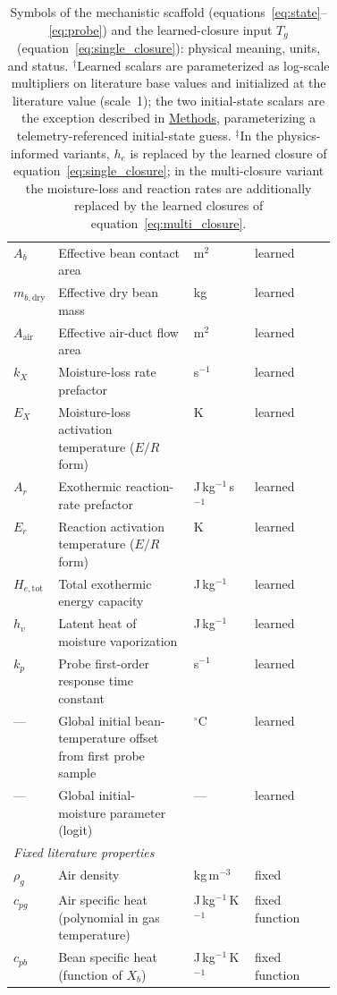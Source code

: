 \documentclass[fleqn,10pt]{wlscirep}
\newcommand{\Methods}{\hyperref[sec:methods]{Methods}}
\begin{document}
\begin{table}[!htbp]
{\begin{tabular}{|l|p{0.42\linewidth}|l|l|}
$A_b$ & Effective bean contact area & m$^2$ & learned \\
$m_{b,\mathrm{dry}}$ & Effective dry bean mass & kg & learned \\
$A_{\mathrm{air}}$ & Effective air-duct flow area & m$^2$ & learned \\
$k_X$ & Moisture-loss rate prefactor & s$^{-1}$ & learned \\
$E_X$ & Moisture-loss activation temperature ($E/R$ form) & K & learned \\
$A_r$ & Exothermic reaction-rate prefactor & J\,kg$^{-1}$\,s$^{-1}$ & learned \\
$E_r$ & Reaction activation temperature ($E/R$ form) & K & learned \\
$H_{e,\mathrm{tot}}$ & Total exothermic energy capacity & J\,kg$^{-1}$ & learned \\
$h_v$ & Latent heat of moisture vaporization & J\,kg$^{-1}$ & learned \\
$k_p$ & Probe first-order response time constant & s$^{-1}$ & learned \\
--- & Global initial bean-temperature offset from first probe sample & $^{\circ}$C & learned \\
--- & Global initial-moisture parameter (logit) & --- & learned \\
\hline
\multicolumn{4}{|l|}{\emph{Fixed literature properties}} \\
\hline
$\rho_g$ & Air density & kg\,m$^{-3}$ & fixed \\
$c_{pg}$ & Air specific heat (polynomial in gas temperature) & J\,kg$^{-1}$\,K$^{-1}$ & fixed function \\
$c_{pb}$ & Bean specific heat (function of $X_b$) & J\,kg$^{-1}$\,K$^{-1}$ & fixed function \\
\hline
\end{tabular}
\caption{Symbols of the mechanistic scaffold (equations~\eqref{eq:state}--\eqref{eq:probe}) and the learned-closure input $T_g$ (equation~\eqref{eq:single_closure}): physical meaning, units, and status. $^{\dagger}$Learned scalars are parameterized as log-scale multipliers on literature base values and initialized at the literature value (scale~1); the two initial-state scalars are the exception described in \Methods, parameterizing a telemetry-referenced initial-state guess. $^{\ddagger}$In the physics-informed variants, $h_e$ is replaced by the learned closure of equation~\eqref{eq:single_closure}; in the multi-closure variant the moisture-loss and reaction rates are additionally replaced by the learned closures of equation~\eqref{eq:multi_closure}.}
\label{tab:symbols}
}
\end{table}
\end{document}
